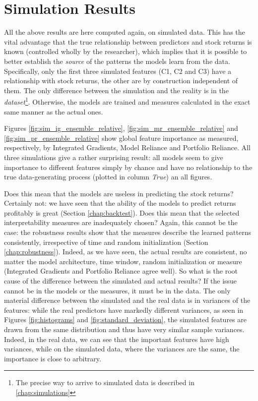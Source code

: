		
	\section{Simulation Results}
	
		All the above results are here computed again, on simulated data. This has the vital advantage that the true relationship between predictors and stock returns is known (controlled wholly by the researcher), which implies that it is possible to better establish the \textit{source} of the patterns the models learn from the data. Specifically, only the first three simulated features (C1, C2 and C3) have a relationship with stock returns, the other are by construction independent of them. The only difference between the simulation and the reality is in the \textit{dataset}\footnote{The precise way to arrive to simulated data is described in \ref{chap:simulations}}. Otherwise, the models are trained and measures calculated in the exact same manner as the actual ones. 
		
		Figures \ref{fig:sim_ig_ensemble_relative}, \ref{fig:sim_mr_ensemble_relative} and \ref{fig:sim_pr_ensemble_relative} show global feature importance as measured, respectively, by Integrated Gradients, Model Reliance and Portfolio Reliance. All three simulations give a rather surprising result: all models seem to give importance to different features simply by chance and have no relationship to the true data-generating process (plotted in column \textit{True}) an all figures. 
			
		Does this mean that the models are useless in predicting the stock returns? Certainly not: we have seen that the ability of the models to predict returns profitably is great (Section \ref{chap:backtest}). Does this mean that the selected interpretability measures are inadequately chosen? Again, this cannot be the case: the robustness results show that the measures describe the learned patterns consistently, irrespective of time and random initialization (Section \ref{chap:robustness}). Indeed, as we have seen, the actual results are consistent, no matter the model architecture, time window, random initialization or measure (Integrated Gradients and Portfolio Reliance agree well). So what is the root cause of the difference between the simulated and actual results? If the issue cannot be in the models or the measures, it must be in the data. The only material difference between the simulated and the real data is in variances of the features: while the real predictors have markedly different variances, as seen in Figures \ref{fig:histograms} and \ref{fig:standard_deviation}, the simulated features are drawn from the same distribution and thus have very similar sample variances. Indeed, in the real data, we can see that the important features have high variances, while on the simulated data, where the variances are the same, the importance is close to arbitrary.
		
